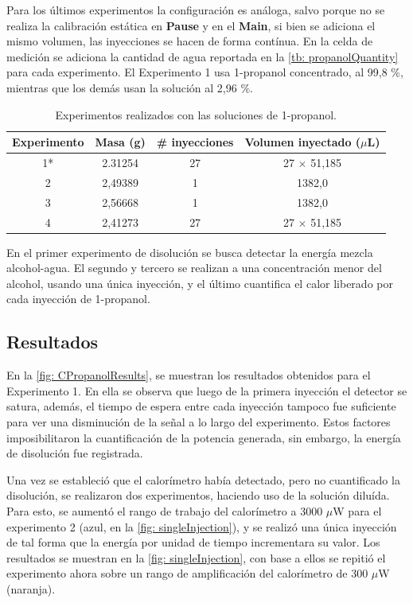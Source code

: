	Para los \'ultimos experimentos la configuraci\'on es an\'aloga, salvo porque no se realiza la calibraci\'on est\'atica en \textbf{Pause} y en el \textbf{Main}, si bien se adiciona el mismo volumen, las inyecciones se hacen de forma cont\'inua. En la celda de medici\'on se adiciona la cantidad de agua reportada en la \autoref{tb: propanolQuantity} para cada experimento. El Experimento 1 usa 1-propanol concentrado, al 99,8 \%, mientras que los demás usan la soluci\'on al 2,96 \%.
	\begin{table}[h]
		\centering
		\caption{Experimentos realizados con las soluciones de 1-propanol.}
		\begin{tabular}{cccc}
			\hline
			\textbf{Experimento} & \textbf{Masa \ce{H2O} (g)} & \textbf{\# inyecciones} & \textbf{Volumen inyectado ($\mu$L)}\\
			\hline
			1* & 2.31254 & 27 & 27 $\times$ 51,185 \\
			2 & 2,49389 & 1 & 1382,0 \\
			3 & 2,56668 & 1 & 1382,0 \\
			4 & 2,41273 & 27 & 27 $\times$ 51,185 \\
			\hline
		\end{tabular}
		\label{tb: propanolQuantity}
	\end{table}
	
	En el primer experimento de disoluci\'on se busca detectar la energ\'ia mezcla alcohol-agua. El segundo y tercero se realizan a una concentraci\'on menor del alcohol, usando una \'unica inyecci\'on, y el \'ultimo cuantifica el calor liberado por cada inyecci\'on de 1-propanol.
	
	\subsection{Resultados}
		En la \autoref{fig: CPropanolResults}, se muestran los resultados obtenidos para el Experimento 1. En ella se observa que luego de la primera inyecci\'on el detector se satura, adem\'as, el tiempo de espera entre cada inyecci\'on tampoco fue suficiente para ver una disminuci\'on de la se\~nal a lo largo del experimento. Estos factores imposibilitaron la cuantificaci\'on de la potencia generada, sin embargo, la energía de disoluci\'on fue registrada.
		
		Una vez se estableci\'o que el calor\'imetro hab\'ia detectado, pero no cuantificado la disoluci\'on, se realizaron dos experimentos, haciendo uso de la soluci\'on dilu\'ida. Para esto, se aument\'o el rango de trabajo del calor\'imetro a 3000 $\mu$W para el experimento 2 (azul, en la \autoref{fig: singleInjection}), y se realiz\'o una \'unica inyecci\'on de tal forma que la energ\'ia por unidad de tiempo incrementara su valor. Los resultados se muestran en la \autoref{fig: singleInjection}, con base a ellos se repiti\'o el experimento ahora sobre un rango de amplificaci\'on del calor\'imetro de 300 $\mu$W (naranja).
		\newpage
		
